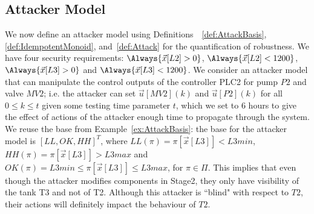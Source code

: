 {\subsection{Attacker Model}%
We now define an attacker model using Definitions~~\ref{def:AttackBasis},\ref{def:IdempotentMonoid}, and~\ref{def:Attack} for the quantification of robustness. We have four security requirements: $\Always{\vec{x}[L2]>0}$, $\Always{\vec{x}[L2]<1200}$, $\Always{\vec{x}[L3]>0}$ and $\Always{\vec{x}[L3]<1200}$. We consider an attacker model that can manipulate the control outputs of the controller PLC2 for pump $P2$ and valve $MV2$; i.e. the attacker can set $\vec{u}[MV2](k)$ and $\vec{u}[P2](k)$ for all $0\leq k\leq t$ given some testing time parameter $t$, which we set to 6 hours to give the effect of actions of the attacker enough time to propagate through the system. We reuse the base from Example~\ref{ex:AttackBasis}: the base for the attacker model is $[LL, OK, HH]^T$, where ${LL}(\pi)=\pi[\vec{x}[L3]]<L3min$, ${HH}(\pi)=\pi[\vec{x}[L3]]>L3max$ and ${OK}(\pi)=L3min \leq \pi[\vec{x}[L3]]\leq L3max$, for $\pi \in \Pi$. This implies that even though the attacker modifies components in Stage2, they only have visibility of the tank T3 and not of T2. Although this attacker is ``blind" with respect to $T2$, their actions will definitely impact the behaviour of $T2$. 

}
